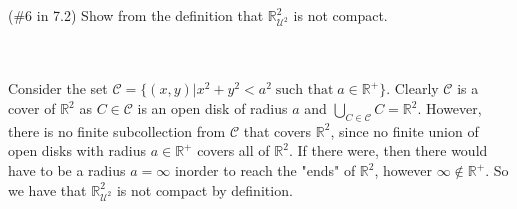 (\#6 in 7.2) Show from the definition that $\mathbb{R}^2_{\mathcal{U}^2}$ is not compact.\\\\

\begin{solution}\renewcommand{\qedsymbol}{}\ \\
    Consider the set $\mathcal{C}=\{(x,y)|x^2+y^2<a^2\; \text{such that}\; a\in\mathbb{R}^+\}$. Clearly
    $\mathcal{C}$ is a cover of $\mathbb{R}^2$ as $C\in\mathcal{C}$ is an open disk of radius $a$ and
    $\bigcup_{C\in\mathcal{C}}C=\mathbb{R}^2$. However, there is no finite subcollection from
    $\mathcal{C}$ that covers $\mathbb{R}^2$, since no finite union of open disks with radius
    $a\in\mathbb{R}^+$ covers all of $\mathbb{R}^2$. If there were, then there would have to be a radius
    $a=\infty$ inorder to reach the "ends" of $\mathbb{R}^2$, however $\infty\notin\mathbb{R}^+$. So we
    have that $\mathbb{R}^2_{\mathcal{U}^2}$ is not compact by definition.

\end{solution}